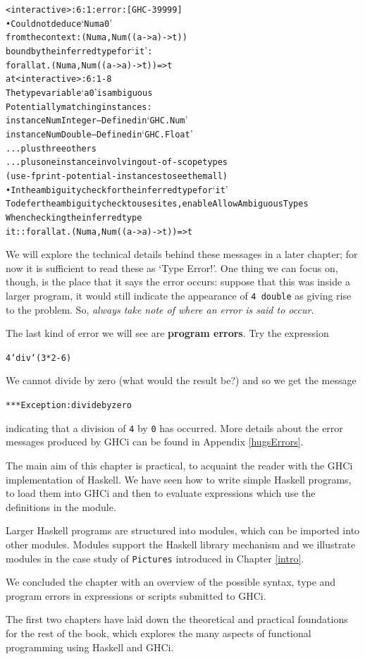 \begin{alltt}
<interactive>:6:1: error: [GHC-39999]
    • Could not deduce ‘Num a0’
      from the context: (Num a, Num ((a -> a) -> t))
        bound by the inferred type for ‘it’:
                   forall {a} {t}. (Num a, Num ((a -> a) -> t)) => t
        at <interactive>:6:1-8
      The type variable ‘a0’ is ambiguous
      Potentially matching instances:
        instance Num Integer -- Defined in ‘GHC.Num’
        instance Num Double -- Defined in ‘GHC.Float’
        ...plus three others
        ...plus one instance involving out-of-scope types
        (use -fprint-potential-instances to see them all)
    • In the ambiguity check for the inferred type for ‘it’
      To defer the ambiguity check to use sites, enable AllowAmbiguousTypes
      When checking the inferred type
        it :: forall {a} {t}. (Num a, Num ((a -> a) -> t)) => t
\end{alltt}
We will explore the technical details behind these messages in a later
chapter; for now it is sufficient to read these as `Type Error!'. One thing we can focus on, though, is the place that it says the error occurs: suppose that this was inside a larger program, it would still indicate the appearance of \texttt{4 double} as giving rise to the problem. So, \emph{always take note of where an error is said to occur.}

The last kind of error we will see are \textbf{program errors}. Try the
expression

\begin{alltt} 
4 `div` (3*2-6)
\end{alltt}
We cannot divide by zero (what would the result be?) and so we get the message

\begin{alltt}
*** Exception: divide by zero
\end{alltt}
indicating that a division of \texttt{4} by \texttt{0} has occurred.
More details about the error messages produced by GHCi
can
be found in Appendix \ref{hugsErrors}.



\begin{summary}
The main aim of this chapter is practical, to acquaint the reader with the 
GHCi implementation of Haskell. We have seen how to write simple Haskell
programs, to load them into GHCi and then to evaluate expressions which use
the definitions in the module.

Larger Haskell programs are structured into modules, which can be
imported into other modules. Modules support the Haskell library
mechanism and we illustrate modules in the case study of \texttt{Pictures}
introduced in Chapter \ref{intro}.

We concluded the chapter with an overview of the possible syntax, type 
and program errors in expressions or scripts submitted to GHCi. 

The first two chapters have laid down the theoretical and practical
foundations for the rest of the book, which explores the many aspects of
functional programming using Haskell and GHCi.
\end{summary}
% 


